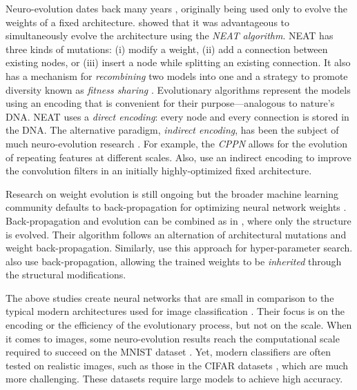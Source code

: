 \documentclass{article}
\renewcommand{\cite}[1]{\citep{#1}}
\begin{document}
Neuro-evolution dates back many years \cite{miller1989designing}, originally being used only to evolve the weights of a fixed architecture. \citet{stanley2002evolving} showed that it was advantageous to simultaneously evolve the architecture using the {\em NEAT algorithm}. NEAT has three kinds of mutations: (i) modify a weight, (ii) add a connection between existing nodes, or (iii) insert a node while splitting an existing connection. It also has a mechanism for {\em recombining} two models into one and a strategy to promote diversity known as {\em fitness sharing} \cite{goldberg1987genetic}. Evolutionary algorithms represent the models using an encoding that is convenient for their purpose---analogous to nature's DNA. NEAT uses a {\em direct encoding}: every node and every connection is stored in the DNA. The alternative paradigm, {\em indirect encoding}, has been the subject of much neuro-evolution research \cite{gruau1993genetic, stanley2009hypercube, pugh2013evolving, kim2015deep, fernando2016convolution}. For example, the {\em CPPN} \cite{stanley2007compositional, stanley2009hypercube} allows for the evolution of repeating features at different scales. Also, \citet{kim2015deep} use an indirect encoding to improve the convolution filters in an initially highly-optimized fixed architecture.

Research on weight evolution is still ongoing \cite{morse2016simple} but the broader machine learning community defaults to back-propagation for optimizing neural network weights \cite{rumelhart1988learning}. Back-propagation and evolution can be combined as in \citet{stanley2009hypercube}, where only the structure is evolved. Their algorithm follows an alternation of architectural mutations and weight back-propagation. Similarly, \citet{breuel2010automlp} use this approach for hyper-parameter search. \citet{fernando2016convolution} also use back-propagation, allowing the trained weights to be {\em inherited} through the structural modifications.

The above studies create neural networks that are small in comparison to the typical modern architectures used for image classification \cite{he2016deep, huang2016densely}. Their focus is on the encoding or the efficiency of the evolutionary process, but not on the scale. When it comes to images, some neuro-evolution results reach the computational scale required to succeed on the MNIST dataset \cite{lecun1998mnist}. Yet, modern classifiers are often tested on realistic images, such as those in the CIFAR datasets \cite{krizhevsky2009learning}, which are much more challenging. These datasets require large models to achieve high accuracy.
\end{document}
